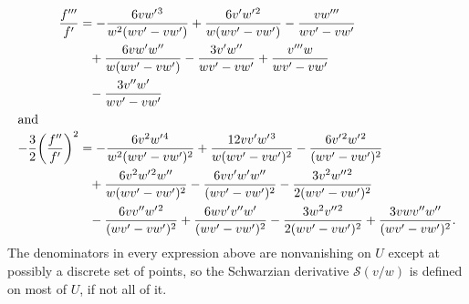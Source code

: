 \documentclass[11pt,leqno]{article}
\theoremstyle{plain}
\theoremstyle{definition}
\numberwithin{equation}{section}
\numberwithin{lem}{section}
\begin{document}
\begin{align*}
    \frac{f^{\prime\prime\prime}}{f^\prime} &= -\frac{6 v{} w^{\prime}{}^3}{w{}^2 (w{} v^{\prime}{} - v{} w^{\prime}{})} + \frac{6 v^{\prime}{} w^{\prime}{}^2}{w{} (w{} v^{\prime}{} - v{} w^{\prime}{})} - \frac{v{} w^{\prime\prime\prime}{}}{w{} v^{\prime}{} - v{} w^{\prime}{}} \\
    &\phantom{=}+ \frac{6 v{} w^{\prime}{} w^{\prime\prime}{}}{w{} (w{} v^{\prime}{} - v{} w^{\prime}{})} - \frac{3 v^{\prime}{} w^{\prime\prime}{}}{w{} v^{\prime}{} - v{} w^{\prime}{}} + \frac{v^{\prime\prime\prime}{} w{}}{w{} v^{\prime}{} - v{} w^{\prime}{}} \\
    &\phantom{=}- \frac{3 v^{\prime\prime}{} w^{\prime}{}}{w{} v^{\prime}{} - v{} w^{\prime}{}} \\\intertext{and}
    -\frac{3}{2}\biggl(\frac{f^{\prime\prime}}{f^\prime}\biggr)^2 &= -\frac{6 v{}^2 w^{\prime}{}^4}{w{}^2 (w{} v^{\prime}{} - v{} w^{\prime}{})^2} + \frac{12 v{} v^{\prime}{} w^{\prime}{}^3}{w{} (w{} v^{\prime}{} - v{} w^{\prime}{})^2} - \frac{6 v^{\prime}{}^2 w^{\prime}{}^2}{(w{} v^{\prime}{} - v{} w^{\prime}{})^2} \\
    &\phantom{=}+ \frac{6 v{}^2 w^{\prime}{}^2 w^{\prime\prime}{}}{w{} (w{} v^{\prime}{} - v{} w^{\prime}{})^2} - \frac{6 v{} v^{\prime}{} w^{\prime}{} w^{\prime\prime}{}}{(w{} v^{\prime}{} - v{} w^{\prime}{})^2} - \frac{3 v{}^2 w^{\prime\prime}{}^2}{2 (w{} v^{\prime}{} - v{} w^{\prime}{})^2}\\
    &\phantom{=} - \frac{6 v{} v^{\prime\prime}{} w^{\prime}{}^2}{(w{} v^{\prime}{} - v{} w^{\prime}{})^2} + \frac{6 w{} v^{\prime}{} v^{\prime\prime}{} w^{\prime}{}}{(w{} v^{\prime}{} - v{} w^{\prime}{})^2} - \frac{3 w{}^2 v^{\prime\prime}{}^2}{2 (w{} v^{\prime}{} - v{} w^{\prime}{})^2} + \frac{3 v{} w{} v^{\prime\prime}{} w^{\prime\prime}{}}{(w{} v^{\prime}{} - v{} w^{\prime}{})^2}.
\end{align*}
The denominators in every expression above are nonvanishing on $U$ except at possibly a discrete set of points, so the Schwarzian derivative $\mathscr S(v/w)$ is defined on most of $U$, if not all of it.
\end{document}
